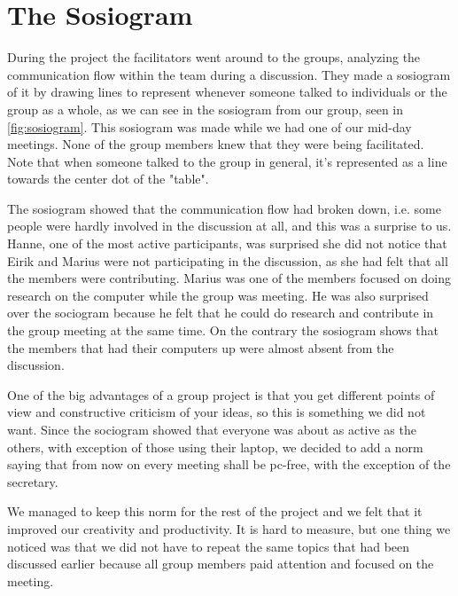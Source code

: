 \section{The Sosiogram}
During the project the facilitators went around to the groups, analyzing the communication flow within the team during a discussion. They made a sosiogram of it by drawing lines to represent whenever someone talked to individuals or the group as a whole, as we can see in the sosiogram from our group, seen in \autoref{fig:sosiogram}. This sosiogram was made while we had one of our mid-day meetings. None of the group members knew that they were being facilitated. Note that when someone talked to the group in general, it's represented as a line towards the center dot of the "table".

The sosiogram showed that the communication flow had broken down, i.e. some people were hardly involved in the discussion at all, and this was a surprise to us. Hanne, one of the most active participants, was surprised she did not notice that Eirik and Marius were not participating in the discussion, as she had felt that all the members were contributing. Marius was one of the members focused on doing research on the computer while the group was meeting. He was also surprised over the sociogram because he felt that he could do research and contribute in the group meeting at the same time. On the contrary the sosiogram shows that the members that had their computers up were almost absent from the discussion.

One of the big advantages of a group project is that you get different points of view and constructive criticism of your ideas, so this is something we did not want. Since the sociogram showed that everyone was about as active as the others, with exception of those using their laptop, we decided to add a norm saying that from now on every meeting shall be pc-free, with the exception of the secretary. 

We managed to keep this norm for the rest of the project and we felt that it improved our creativity and productivity. It is hard to measure, but one thing we noticed was that we did not have to repeat the same topics that had been discussed earlier because all group members paid attention and focused on the meeting. 


